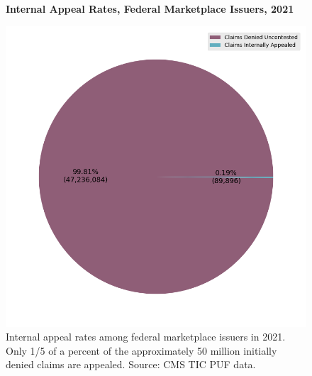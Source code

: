 \documentclass[12pt, a4paper]{report}
\begin{document}
\begin{figure}
	\centering
	\textbf{Internal Appeal Rates, Federal Marketplace Issuers, 2021}\par\medskip
	\includegraphics[width=0.85\columnwidth]{images/cms_puf/internal_appeal_rates_all_insurers.png}
	\caption{ Internal appeal rates among federal marketplace issuers in 2021. Only 1/5 of a percent of the approximately 50 million initially denied claims are appealed. Source: CMS TIC PUF data.}
	\label{federal_internal_appeal_rates}
\end{figure}
\end{document}
